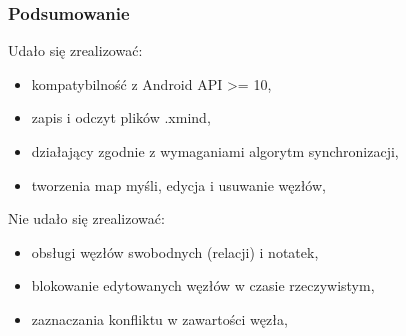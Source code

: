 %
%
%
%
%

\begin{frame}
\frametitle{Podsumowanie}

Udało się zrealizować:
\begin{itemize}
		\item kompatybilność z Android API >= 10,
		\item zapis i odczyt plików .xmind,
		\item działający zgodnie z wymaganiami algorytm synchronizacji,
		\item tworzenia map myśli, edycja i usuwanie węzłów,
\end{itemize}

\vspace{+1.5em}

Nie udało się zrealizować: 
\begin{itemize}
		\item obsługi węzłów swobodnych (relacji)  i notatek,
		\item blokowanie edytowanych węzłów w czasie rzeczywistym,
		\item zaznaczania konfliktu w zawartości węzła,
\end{itemize}

\end{frame}
